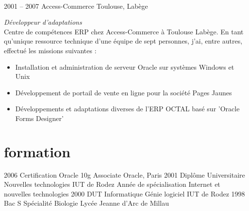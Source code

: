 \documentclass{friggeri-cv} 	%
\begin{document}
\begin{entrylist}
{}\\

\entry
{2001 -- 2007}
{Access-Commerce}
{Toulouse, Labège}
{\vspace{0.2cm}\emph{Développeur d'adaptations}  \\
Centre de compétences ERP chez Access-Commerce à Toulouse Labège.
En tant qu’unique ressource technique d'une équipe de sept personnes, j’ai, entre autres, effectué les
missions suivantes :
\begin{itemize}
\item Installation et administration de serveur Oracle sur systèmes Windows et Unix
\item Développement de portail de vente en ligne pour la société Pages Jaunes
\item Développements et adaptations diverses de l'ERP OCTAL basé sur 'Oracle Forms Designer'
\end{itemize}
}
\end{entrylist}
\newpage


\section{formation}

\begin{entrylist}
\entry
{2006}
{Certification Oracle {\normalfont 10g Associate}}
{Oracle, Paris}
{}
\entry
{2001}
{Diplôme Universitaire {\normalfont Nouvelles technologies}}
{IUT de Rodez}
{Année de spécialisation Internet et nouvelles technologies}
\entry
{2000}
{DUT {\normalfont Informatique Génie logiciel}}
{IUT de Rodez}
{}
\entry
{1998}
{Bac S {\normalfont Spécialité Biologie}}
{Lycée Jeanne d'Arc de Millau}
{}
\end{entrylist}

\end{document}
